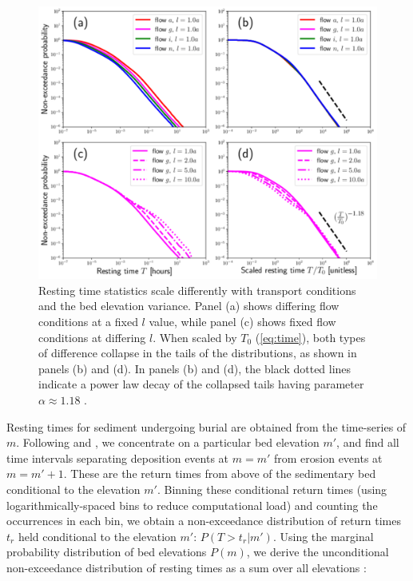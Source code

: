 \documentclass[draft]{agujournal2018}
\begin{document}
\begin{figure}[t!]
	\includegraphics[width=\linewidth,keepaspectratio]{../figures/montage1.pdf}
	\caption{Resting time statistics scale differently with transport conditions and the bed elevation variance. Panel (a) shows differing flow conditions at a fixed $l$ value, while panel (c) shows fixed flow conditions at differing $l$. When scaled by $T_0$ (\ref{eq:time}), both types of difference collapse in the tails of the distributions, as shown in panels (b) and (d). In panels (b) and (d), the black dotted lines indicate a power law decay of the collapsed tails having parameter $\alpha\approx1.18$ .}
	\label{fig:cdfs}
\end{figure}
Resting times for sediment undergoing burial are obtained from the time-series of $m$.
Following \citet{Voepel2013} and \citet{Martin2014}, we concentrate on a particular bed elevation $m'$, and find all time intervals separating deposition events at $m=m'$ from erosion events at $m=m'+1$.
These are the return times from above of the sedimentary bed conditional to the elevation $m'$.
Binning these conditional return times (using logarithmically-spaced bins to reduce computational load) and counting the occurrences in each bin, we obtain a non-exceedance distribution of return times $t_r$ held conditional to the elevation $m'$: $P(T>t_r|m')$.
Using the marginal probability distribution of bed elevations $P(m)$, we derive the unconditional non-exceedance distribution of resting times as a sum over all elevations \citep{Yang1971, Nakagawa1980, Voepel2013, Martin2014}:
\end{document}
